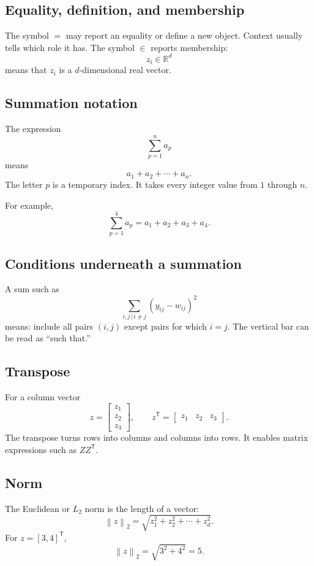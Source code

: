 \documentclass[11pt,oneside,openany]{book}
\theoremstyle{myplain}
\theoremstyle{definition}
\newcommand{\R}{\mathbb{R}}
\newcommand{\norm}[1]{\left\lVert #1\right\rVert}
\begin{document}
\subsection{Equality, definition, and membership}

The symbol $=$ may report an equality or define a new object. Context usually tells which role it has. The symbol $\in$ reports membership:
\[
  z_i\in\R^d
\]
means that $z_i$ is a $d$-dimensional real vector.

\subsection{Summation notation}

The expression
\[
  \sum_{p=1}^{n} a_p
\]
means
\[
  a_1+a_2+\cdots+a_n.
\]
The letter $p$ is a temporary index. It takes every integer value from $1$ through $n$.

For example,
\[
  \sum_{p=1}^{4} a_p
  =a_1+a_2+a_3+a_4.
\]

\subsection{Conditions underneath a summation}

A sum such as
\[
  \sum_{i,j\,|\,i\ne j}(y_{ij}-w_{ij})^2
\]
means: include all pairs $(i,j)$ except pairs for which $i=j$. The vertical bar can be read as ``such that.''

\subsection{Transpose}

For a column vector
\[
z=\begin{bmatrix}z_1\\z_2\\z_3\end{bmatrix},
\qquad
z^{\mathsf T}=\begin{bmatrix}z_1&z_2&z_3\end{bmatrix}.
\]
The transpose turns rows into columns and columns into rows. It enables matrix expressions such as $ZZ^{\mathsf T}$.

\subsection{Norm}

The Euclidean or $L_2$ norm is the length of a vector:
\[
  \norm{z}_2=\sqrt{z_1^2+z_2^2+\cdots+z_d^2}.
\]
For $z=[3,4]^{\mathsf T}$,
\[
  \norm{z}_2=\sqrt{3^2+4^2}=5.
\]
\end{document}
